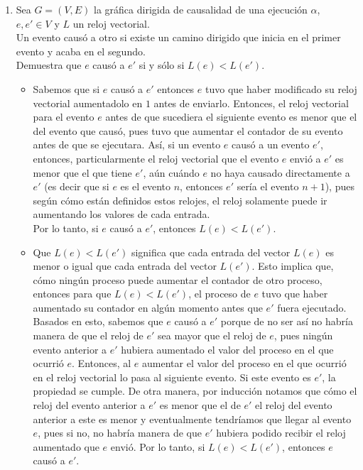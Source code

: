 \documentclass[12pt,a4paper]{report}
\begin{document}
\begin{enumerate}
	\item {
		Sea $G = (V, E)$ la gráfica dirigida de causalidad de una ejecución
		$\alpha$, $e, e' \in V$ y $L$ un reloj vectorial.\\
		Un evento causó a otro si existe un camino dirigido que inicia en
		el primer evento y acaba en el segundo.\\
		Demuestra que $e$ causó a $e'$ si y sólo si $L(e) < L(e')$.
    \begin{itemize}
        \item[\rightarrow]{
            Sabemos que si $e$ causó a $e'$ entonces $e$ tuvo que haber
            modificado su reloj vectorial aumentadolo en $1$ antes de enviarlo.
            Entonces, el reloj vectorial para el evento $e$ antes de que
            sucediera el siguiente evento es menor que el del evento que causó,
            pues tuvo que aumentar el contador de su evento antes de que se
            ejecutara. Así, si un evento $e$ causó a un evento $e'$, entonces,
            particularmente el reloj vectorial que el evento $e$ envió a $e'$
            es menor que el que tiene $e'$, aún cuándo $e$ no haya causado
            directamente a $e'$ (es decir que si $e$ es el evento $n$, entonces
            $e'$ sería el evento $n+1$), pues según cómo están definidos estos
            relojes, el reloj solamente puede ir aumentando los valores de cada
            entrada.\\
            Por lo tanto, si $e$ causó a $e'$, entonces $L(e) < L(e')$.
        }
        \item[\leftarrow]{
            Que $L(e) < L(e')$ significa que cada entrada del vector $L(e)$ es
            menor o igual que cada entrada del vector $L(e')$. Esto implica que,
            cómo ningún proceso puede aumentar el contador de otro proceso,
            entonces para que $L(e) < L(e')$, el proceso de $e$ tuvo que haber
            aumentado su contador en algún momento antes que $e'$ fuera
            ejecutado.\\
            Basados en esto, sabemos que $e$ causó a $e'$ porque de no ser así
            no habría manera de que el reloj de $e'$ sea mayor que el reloj de
            $e$, pues ningún evento anterior a $e'$ hubiera aumentado el
            valor del proceso en el que ocurrió $e$. Entonces, al $e$ aumentar
            el valor del proceso en el que ocurrió en el reloj vectorial lo pasa
            al siguiente evento. Si este evento es $e'$, la propiedad se cumple.
            De otra manera, por inducción notamos que cómo el reloj del evento
            anterior a $e'$ es menor que el de $e'$ el reloj del evento anterior
            a este es menor y eventualmente tendríamos que llegar al evento
            $e$, pues si no, no habría manera de que $e'$ hubiera podido recibir
            el reloj aumentado que $e$ envió.
            Por lo tanto, si $L(e) < L(e')$, entonces $e$ causó a $e'$.
        }
    \end{itemize}
	}


\end{enumerate}
\end{document}
